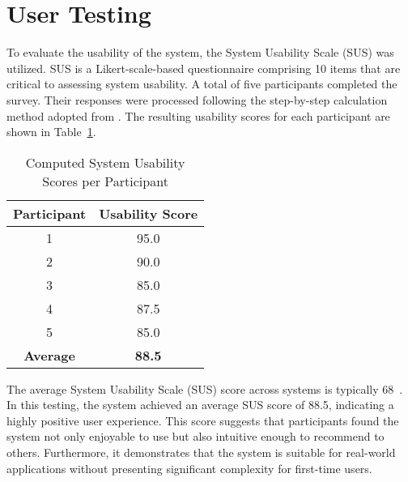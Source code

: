 \section{User Testing}
To evaluate the usability of the system, the System Usability Scale (SUS) was utilized. SUS is a Likert-scale-based questionnaire comprising 10 items that are critical to assessing system usability. A total of five participants completed the survey. Their responses were processed following the step-by-step calculation method adopted from \cite{babich_sus_usability_website}. The resulting usability scores for each participant are shown in Table~\ref{tab:sus_scores}.

\begin{table}[h!]
	\centering
	\begin{tabular}{|c|c|}
		\hline
		\textbf{Participant} & \textbf{Usability Score} \\
		\hline
		1 & 95.0 \\
		2 & 90.0 \\
		3 & 85.0 \\
		4 & 87.5 \\
		5 & 85.0 \\
		\hline
		\textbf{Average} & \textbf{88.5} \\
		\hline
	\end{tabular}
	\caption{Computed System Usability Scores per Participant}
	\label{tab:sus_scores}
\end{table}

The average System Usability Scale (SUS) score across systems is typically 68~\cite{babich_sus_usability_website}. In this testing, the system achieved an average SUS score of 88.5, indicating a highly positive user experience. This score suggests that participants found the system not only enjoyable to use but also intuitive enough to recommend to others. Furthermore, it demonstrates that the system is suitable for real-world applications without presenting significant complexity for first-time users.




